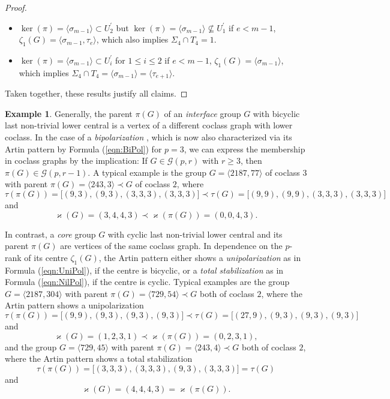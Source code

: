 \documentclass{amsart}
\theoremstyle{definition}
\newtheorem{example}{Example}[section]
\numberwithin{equation}{section}
\begin{document}
\begin{proof}
\begin{itemize}
\item
\(\ker(\pi)=\langle\sigma_{m-1}\rangle\subset U_2^\prime\) but
\(\ker(\pi)=\langle\sigma_{m-1}\rangle\not\subseteq U_1^\prime\)
if \(e<m-1\), \(\zeta_1(G)=\langle\sigma_{m-1},\tau_{e}\rangle\),
which also implies \(\Sigma_4\cap T_4=1\).

\item
\(\ker(\pi)=\langle\sigma_{m-1}\rangle\subset U_i^\prime\)
for \(1\le i\le 2\) if \(e<m-1\), \(\zeta_1(G)=\langle\sigma_{m-1}\rangle\),
which implies \(\Sigma_4\cap T_4=\langle\sigma_{m-1}\rangle=\langle\tau_{e+1}\rangle\).

\end{itemize}

\noindent
Taken together, these results justify all claims.
\end{proof}


\begin{example}
\label{exm:NonMaxClass}
Generally, the parent \(\pi(G)\) of an \textit{interface} group \(G\)
\cite[Dfn.3.3, p.430]{Ma4}
with bicyclic last non-trivial lower central
is a vertex of a different coclass graph with lower coclass.
In the case of a \textit{bipolarization}
\cite[Dfn.3.2, p.430]{Ma4},
which is now also characterized via its Artin pattern by Formula
(\ref{eqn:BiPol})
for \(p=3\),
we can express the membership in coclass graphs by the implication:
If \(G\in\mathcal{G}(p,r)\) with \(r\ge 3\), then \(\pi(G)\in\mathcal{G}(p,r-1)\).
A typical example is the group \(G=\langle 2187,77\rangle\) of coclass \(3\)
with parent \(\pi(G)=\langle 243,3\rangle\prec G\) of coclass \(2\), where
\[\tau(\pi(G))=
\lbrack (9,3),(9,3),(3,3,3),(3,3,3)\rbrack\prec\tau(G)=\lbrack (9,9),(9,9),(3,3,3),(3,3,3)\rbrack\]
and
\[\varkappa(G)=(3,4,4,3)\prec\varkappa(\pi(G))=(0,0,4,3).\]

\noindent
In contrast, a \textit{core} group \(G\)
\cite[Dfn.3.3, p.430]{Ma4}
with cyclic last non-trivial lower central
and its parent \(\pi(G)\)
are vertices of the same coclass graph.
In dependence on the \(p\)-rank of its centre \(\zeta_1(G)\),
the Artin pattern either shows a \textit{unipolarization} as in Formula
(\ref{eqn:UniPol}),
if the centre is bicyclic, or a \textit{total stabilization} as in Formula
(\ref{eqn:NilPol}),
if the centre is cyclic.
Typical examples are 
the group \(G=\langle 2187,304\rangle\)
with parent \(\pi(G)=\langle 729,54\rangle\prec G\) both of coclass \(2\),
where the Artin pattern shows a unipolarization
\[\tau(\pi(G))=\lbrack (9,9),(9,3),(9,3),(9,3)\rbrack\prec\tau(G)=\lbrack (27,9),(9,3),(9,3),(9,3)\rbrack\]
and
\[\varkappa(G)=(1,2,3,1)\prec\varkappa(\pi(G))=(0,2,3,1),\]
and the group \(G=\langle 729,45\rangle\)
with parent \(\pi(G)=\langle 243,4\rangle\prec G\) both of coclass \(2\),
where the Artin pattern shows a total stabilization
\[\tau(\pi(G))=\lbrack (3,3,3),(3,3,3),(9,3),(3,3,3)\rbrack=\tau(G)\]
and
\[\varkappa(G)=(4,4,4,3)=\varkappa(\pi(G)).\]
\end{example}
\end{document}
